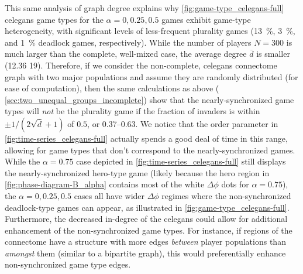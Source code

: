 \documentclass[pdflatex,twocolumn,sn-nature,super]{sn-jnl}
\begin{document}
This same analysis of graph degree explains why
\cref{fig:game-type_celegans-full} \gls{celegans} game types
for the $\alpha = 0,0.25,0.5$ games
exhibit game-type heterogeneity,
with significant levels of less-frequent plurality games
(\SI{13}{\percent}, \SI{3}{\percent}, and \SI{1}{\percent} deadlock games,
respectively).
While the number of players $N = 300$ is much larger
than the complete, well-mixed case,
the average degree $\overline{d}$
is smaller (\num{12.36} \vs{} \num{19}).
Therefore, if we consider the non-complete, \gls{celegans} connectome graph
with two major populations
and assume they are randomly distributed (for ease of computation),
then the same calculations as above
(\cf{} \cref{sec:two_unequal_groups_incomplete}) show that
the nearly-synchronized game types will \emph{not} be the plurality game
if the fraction of invaders is within
$\pm 1/(2 \sqrt{\overline{d}} + 1)$
of $0.5$, or \numrange{0.37}{0.63}.
We notice that the order parameter in \cref{fig:time-series_celegans-full}
actually spends a good deal of time in this range,
allowing for game types that don't correspond to the nearly-synchronized games.
While the $\alpha = 0.75$ case depicted in \cref{fig:time-series_celegans-full}
still displays the nearly-synchronized hero-type game
(likely because the hero region in \cref{fig:phase-diagram-B_alpha}
contains most of the white $\Delta \phi$ dots for $\alpha = 0.75$),
the $\alpha = 0, 0.25, 0.5$ cases all have wider $\Delta \phi$ regimes where
the non-synchronized deadlock-type games can appear,
as illustrated in \cref{fig:game-type_celegans-full}.
Furthermore, the decreased in-degree of the \gls{celegans} could allow
for additional enhancement of the non-synchronized game types.
For instance, if regions of the connectome have a structure with more edges
\emph{between} player populations than \emph{amongst} them
(similar to a bipartite graph),
this would preferentially enhance non-synchronized game type edges.
\end{document}
